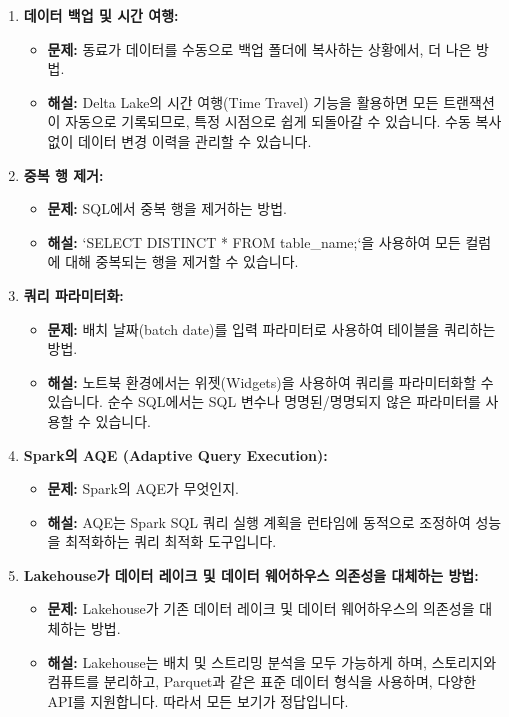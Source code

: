\documentclass[11pt,a4paper]{article}
\begin{document}
\begin{enumerate}
    \item \textbf{데이터 백업 및 시간 여행:}
    \begin{itemize}
        \item \textbf{문제:} 동료가 데이터를 수동으로 백업 폴더에 복사하는 상황에서, 더 나은 방법.
        \item \textbf{해설:} Delta Lake의 시간 여행(Time Travel) 기능을 활용하면 모든 트랜잭션이 자동으로 기록되므로, 특정 시점으로 쉽게 되돌아갈 수 있습니다. 수동 복사 없이 데이터 변경 이력을 관리할 수 있습니다.
    \end{itemize}

    \item \textbf{중복 행 제거:}
    \begin{itemize}
        \item \textbf{문제:} SQL에서 중복 행을 제거하는 방법.
        \item \textbf{해설:} `SELECT DISTINCT * FROM table_name;`을 사용하여 모든 컬럼에 대해 중복되는 행을 제거할 수 있습니다.
    \end{itemize}

    \item \textbf{쿼리 파라미터화:}
    \begin{itemize}
        \item \textbf{문제:} 배치 날짜(batch date)를 입력 파라미터로 사용하여 테이블을 쿼리하는 방법.
        \item \textbf{해설:} 노트북 환경에서는 위젯(Widgets)을 사용하여 쿼리를 파라미터화할 수 있습니다. 순수 SQL에서는 SQL 변수나 명명된/명명되지 않은 파라미터를 사용할 수 있습니다.
    \end{itemize}

    \item \textbf{Spark의 AQE (Adaptive Query Execution):}
    \begin{itemize}
        \item \textbf{문제:} Spark의 AQE가 무엇인지.
        \item \textbf{해설:} AQE는 Spark SQL 쿼리 실행 계획을 런타임에 동적으로 조정하여 성능을 최적화하는 쿼리 최적화 도구입니다.
    \end{itemize}

    \item \textbf{Lakehouse가 데이터 레이크 및 데이터 웨어하우스 의존성을 대체하는 방법:}
    \begin{itemize}
        \item \textbf{문제:} Lakehouse가 기존 데이터 레이크 및 데이터 웨어하우스의 의존성을 대체하는 방법.
        \item \textbf{해설:} Lakehouse는 배치 및 스트리밍 분석을 모두 가능하게 하며, 스토리지와 컴퓨트를 분리하고, Parquet과 같은 표준 데이터 형식을 사용하며, 다양한 API를 지원합니다. 따라서 모든 보기가 정답입니다.
    \end{itemize}


\end{enumerate}
\end{document}
